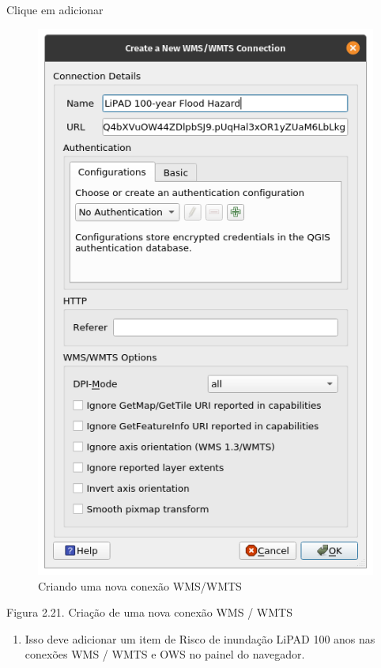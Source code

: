 \documentclass[
  portuguese,
]{krantz}
\providecommand{\tightlist}{%
  \setlength{\itemsep}{0pt}\setlength{\parskip}{0pt}}
\begin{document}
Clique em adicionar

\begin{figure}
\centering
\includegraphics{media/modulo2/wms-1.png}
\caption{Criando uma nova conexão WMS/WMTS}
\end{figure}

Figura 2.21. Criação de uma nova conexão WMS / WMTS

\begin{enumerate}
\def\labelenumi{\arabic{enumi}.}
\setcounter{enumi}{4}
\tightlist
\item
  Isso deve adicionar um item de Risco de inundação LiPAD 100 anos nas conexões WMS / WMTS e OWS no painel do navegador.
\end{enumerate}
\end{document}
